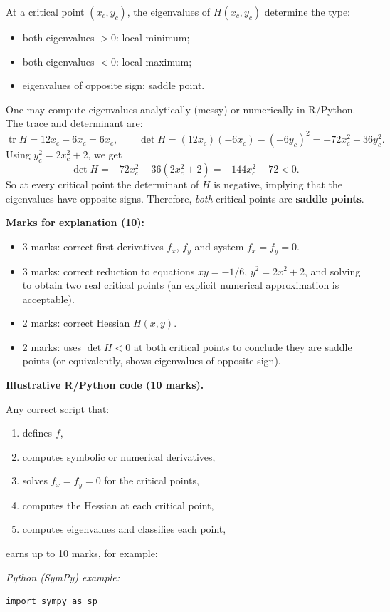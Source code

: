 \documentclass{article}
\begin{document}
\begin{mdframed}[linecolor=black, linewidth=1pt]
At a critical point $(x_c,y_c)$, the eigenvalues of $H(x_c,y_c)$ determine the type:
\begin{itemize}
  \item both eigenvalues $>0$: local minimum;
  \item both eigenvalues $<0$: local maximum;
  \item eigenvalues of opposite sign: saddle point.
\end{itemize}

One may compute eigenvalues analytically (messy) or numerically in R/Python. The trace and determinant are:
\[
\operatorname{tr}H = 12x_c - 6x_c = 6x_c,\qquad
\det H = (12x_c)(-6x_c) - (-6y_c)^2 = -72x_c^2 - 36y_c^2.
\]
Using $y_c^2 = 2x_c^2 + 2$, we get
\[
\det H = -72x_c^2 - 36(2x_c^2+2) = -144x_c^2 - 72 < 0.
\]
So at every critical point the determinant of $H$ is negative, implying that the eigenvalues have opposite signs. Therefore, \emph{both} critical points are \textbf{saddle points}.

\textbf{Marks for explanation (10):}
\begin{itemize}
  \item 3 marks: correct first derivatives $f_x$, $f_y$ and system $f_x=f_y=0$.
  \item 3 marks: correct reduction to equations $xy=-1/6$, $y^2=2x^2+2$, and solving to obtain two real critical points (an explicit numerical approximation is acceptable).
  \item 2 marks: correct Hessian $H(x,y)$.
  \item 2 marks: uses $\det H<0$ at both critical points to conclude they are saddle points (or equivalently, shows eigenvalues of opposite sign).
\end{itemize}

\bigskip
\textbf{Illustrative R/Python code (10 marks).}

Any correct script that:
\begin{enumerate}
  \item defines $f$,
  \item computes symbolic or numerical derivatives,
  \item solves $f_x=f_y=0$ for the critical points,
  \item computes the Hessian at each critical point,
  \item computes eigenvalues and classifies each point,
\end{enumerate}
earns up to 10 marks, for example:

\medskip
\textit{Python (SymPy) example:}
\begin{verbatim}
import sympy as sp


\end{verbatim}
\end{mdframed}
\end{document}
